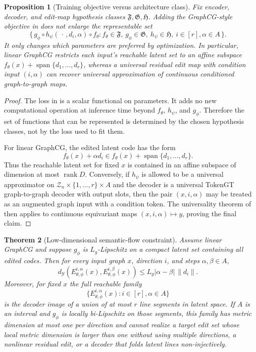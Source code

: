 \documentclass[11pt]{article}
\newtheorem{theorem}{Theorem}[section]
\newtheorem{proposition}[theorem]{Proposition}
\DeclareMathOperator{\rank}{rank}
\newcommand{\cZ}{\mathcal{Z}}
\newcommand{\cY}{\mathcal{Y}}
\begin{document}
\begin{proposition}[Training objective versus architecture class]
\label{prop:graphcg-not-architecture}
Fix encoder, decoder, and edit-map hypothesis classes $\mathfrak F,\mathfrak G,\mathfrak H$.  Adding the GraphCG-style objective in  does not enlarge the representable set
\[
  \{\,g_\phi\circ h_\psi(\,\cdot\,,d_i,\alpha)\circ f_\theta:
  f_\theta\in\mathfrak F,\ g_\phi\in\mathfrak G,\ h_\psi\in\mathfrak H,\ i\in[r],\alpha\in A\,\}.
\]
It only changes which parameters are preferred by optimization.  In particular, linear GraphCG restricts each input's reachable latent set to an affine subspace $f_\theta(x)+\operatorname{span}\{d_1,\dots,d_r\}$, whereas a universal residual edit map with condition input $(i,\alpha)$ can recover universal approximation of continuous conditioned graph-to-graph maps.
\end{proposition}

\begin{proof}
The loss in  is a scalar functional on parameters.  It adds no new computational operation at inference time beyond $f_\theta$, $h_\psi$, and $g_\phi$.  Therefore the set of functions that can be represented is determined by the chosen hypothesis classes, not by the loss used to fit them.

For linear GraphCG, the edited latent code has the form
\[
  f_\theta(x)+\alpha d_i
  \in f_\theta(x)+\operatorname{span}\{d_1,\dots,d_r\}.
\]
Thus the reachable latent set for fixed $x$ is contained in an affine subspace of dimension at most $\rank D$.  Conversely, if $h_\psi$ is allowed to be a universal approximator on $\cZ_n\times\{1,\dots,r\}\times A$ and the decoder is a universal TokenGT graph-to-graph decoder with output slots, then the pair $(x,i,\alpha)$ may be treated as an augmented graph input with a condition token.  The universality theorem of  then applies to continuous equivariant maps $(x,i,\alpha)\mapsto y$, proving the final claim.
\end{proof}

\begin{theorem}[Low-dimensional semantic-flow constraint]
\label{thm:graphcg-flow}
Assume linear GraphCG and suppose $g_\phi$ is $L_g$-Lipschitz on a compact latent set containing all edited codes.  Then for every input graph $x$, direction $i$, and steps $\alpha,\beta\in A$,
\[
  d_{\cY}\!\left(E_{\theta,\phi}^{i,\alpha}(x),
  E_{\theta,\phi}^{i,\beta}(x)\right)
  \le
  L_g |\alpha-\beta|\,\|d_i\|.
\]
Moreover, for fixed $x$ the full reachable family
\[
  \{E_{\theta,\phi}^{i,\alpha}(x): i\in[r],\alpha\in A\}
\]
is the decoder image of a union of at most $r$ line segments in latent space.  If $A$ is an interval and $g_\phi$ is locally bi-Lipschitz on those segments, this family has metric dimension at most one per direction and cannot realize a target edit set whose local metric dimension is larger than one without using multiple directions, a nonlinear residual edit, or a decoder that folds latent lines non-injectively.
\end{theorem}
\end{document}
